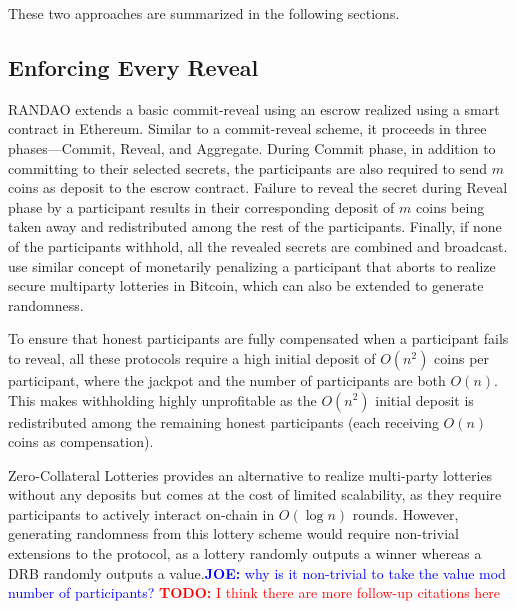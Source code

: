 \documentclass[letterpaper,twocolumn,10pt]{article}
\theoremstyle{definition}
\theoremstyle{remark}
\newcommand{\todo}[1]{\textcolor{red}{\textbf{TODO:} #1}}
\newcommand{\joenote}[1]{\textcolor{blue}{\textbf{JOE:} #1}}
\begin{document}
These two approaches are summarized in the following sections.
\subsection{Enforcing Every Reveal}
RANDAO \cite{youcai2017randao} extends a basic commit-reveal using an escrow realized using a smart contract in Ethereum. Similar to a commit-reveal scheme, it proceeds in three phases---Commit, Reveal, and Aggregate. During Commit phase, in addition to committing to their selected secrets, the participants are also required to send $m$ coins as deposit to the escrow contract. Failure to reveal the secret during Reveal phase by a participant results in their corresponding deposit of $m$ coins being taken away and redistributed among the rest of the participants. Finally, if none of the participants withhold, all the revealed secrets are combined and broadcast. \cite{andrychowicz2014secure, bentov2014use} use similar concept of monetarily penalizing a participant that aborts to realize secure multiparty lotteries in Bitcoin, which can also be extended to generate randomness. 

To ensure that honest participants are fully compensated when a participant fails to reveal, all these protocols require a high initial deposit of $O(n^2)$ coins per participant, where the jackpot and the number of participants are both $O(n)$. This makes withholding highly unprofitable as the $O(n^2)$ initial deposit is redistributed among the remaining honest participants (each receiving $O(n)$ coins as compensation). 

Zero-Collateral Lotteries \cite{miller2017zero} provides an alternative to realize multi-party lotteries without any deposits but comes at the cost of limited scalability, as they require participants to actively interact on-chain in $O(\log n)$ rounds. However, generating randomness from this lottery scheme would require non-trivial extensions to the protocol, as a lottery randomly outputs a winner whereas a DRB randomly outputs a value.\joenote{why is it non-trivial to take the value mod number of participants?}
\todo{I think there are more follow-up citations here}
\end{document}
